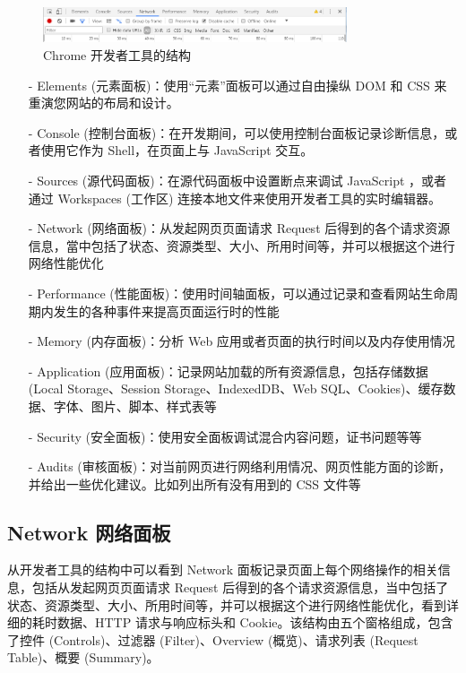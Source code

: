 \begin{figure}[htb]
\centering 
\includegraphics[width=0.80\textwidth]{img/newch1m6.png} 
\caption{Chrome 开发者工具的结构}
\label{Test}
\end{figure}

\begin{itemize}
\item [-] Elements (元素面板)：使用“元素”面板可以通过自由操纵 DOM 和 CSS 来重演您网站的布局和设计。
\item [-] Console (控制台面板)：在开发期间，可以使用控制台面板记录诊断信息，或者使用它作为 Shell，在页面上与 JavaScript 交互。
\item [-] Sources (源代码面板)：在源代码面板中设置断点来调试 JavaScript ，或者通过 Workspaces (工作区) 连接本地文件来使用开发者工具的实时编辑器。
\item [-] Network (网络面板)：从发起网页页面请求 Request 后得到的各个请求资源信息，當中包括了状态、资源类型、大小、所用时间等，并可以根据这个进行网络性能优化
\item [-] Performance (性能面板)：使用时间轴面板，可以通过记录和查看网站生命周期内发生的各种事件来提高页面运行时的性能
\item [-] Memory (内存面板)：分析 Web 应用或者页面的执行时间以及内存使用情况
\item [-] Application (应用面板)：记录网站加载的所有资源信息，包括存储数据 (Local Storage、Session Storage、IndexedDB、Web SQL、Cookies)、缓存数据、字体、图片、脚本、样式表等
\item [-] Security (安全面板)：使用安全面板调试混合内容问题，证书问题等等
\item [-] Audits (审核面板)：对当前网页进行网络利用情况、网页性能方面的诊断，并给出一些优化建议。比如列出所有没有用到的 CSS 文件等
\end{itemize}

\subsection{Network 网络面板}

从开发者工具的结构中可以看到 Network 面板记录页面上每个网络操作的相关信息，包括从发起网页页面请求 Request 后得到的各个请求资源信息，当中包括了状态、资源类型、大小、所用时间等，并可以根据这个进行网络性能优化，看到详细的耗时数据、HTTP 请求与响应标头和 Cookie。该结构由五个窗格组成，包含了控件 (Controls)、过滤器 (Filter)、Overview (概览)、请求列表 (Request Table)、概要 (Summary)。


